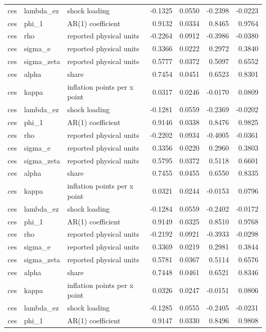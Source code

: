 \begin{tabular}{lllrrrr}
ces & lambda\_ez & shock loading & -0.1325 & 0.0550 & -0.2398 & -0.0223 \\
ces & phi\_1 & AR(1) coefficient & 0.9132 & 0.0334 & 0.8465 & 0.9764 \\
ces & rho & reported physical units & -0.2264 & 0.0912 & -0.3986 & -0.0380 \\
ces & sigma\_e & reported physical units & 0.3366 & 0.0222 & 0.2972 & 0.3840 \\
ces & sigma\_zeta & reported physical units & 0.5777 & 0.0372 & 0.5097 & 0.6552 \\
ces & alpha & share & 0.7454 & 0.0451 & 0.6523 & 0.8301 \\
ces & kappa & inflation points per x point & 0.0317 & 0.0246 & -0.0170 & 0.0809 \\
ces & lambda\_ez & shock loading & -0.1281 & 0.0559 & -0.2369 & -0.0202 \\
ces & phi\_1 & AR(1) coefficient & 0.9146 & 0.0338 & 0.8476 & 0.9825 \\
ces & rho & reported physical units & -0.2202 & 0.0934 & -0.4005 & -0.0361 \\
ces & sigma\_e & reported physical units & 0.3356 & 0.0220 & 0.2960 & 0.3803 \\
ces & sigma\_zeta & reported physical units & 0.5795 & 0.0372 & 0.5118 & 0.6601 \\
ces & alpha & share & 0.7455 & 0.0455 & 0.6550 & 0.8335 \\
ces & kappa & inflation points per x point & 0.0321 & 0.0244 & -0.0153 & 0.0796 \\
ces & lambda\_ez & shock loading & -0.1284 & 0.0559 & -0.2402 & -0.0172 \\
ces & phi\_1 & AR(1) coefficient & 0.9149 & 0.0325 & 0.8510 & 0.9768 \\
ces & rho & reported physical units & -0.2192 & 0.0921 & -0.3933 & -0.0298 \\
ces & sigma\_e & reported physical units & 0.3369 & 0.0219 & 0.2981 & 0.3844 \\
ces & sigma\_zeta & reported physical units & 0.5781 & 0.0367 & 0.5114 & 0.6576 \\
ces & alpha & share & 0.7448 & 0.0461 & 0.6521 & 0.8346 \\
ces & kappa & inflation points per x point & 0.0326 & 0.0247 & -0.0151 & 0.0806 \\
ces & lambda\_ez & shock loading & -0.1285 & 0.0555 & -0.2405 & -0.0231 \\
ces & phi\_1 & AR(1) coefficient & 0.9147 & 0.0330 & 0.8496 & 0.9808 \\

\end{tabular}
